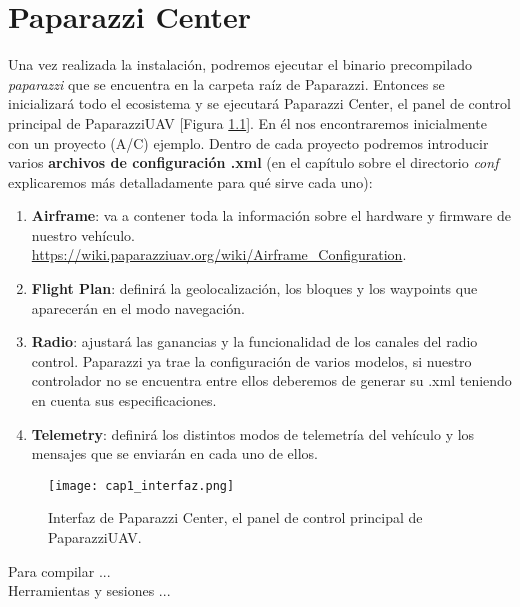 \chapter{Paparazzi Center}


\noindent Una vez realizada la instalación, podremos ejecutar el binario precompilado \textit{paparazzi} que se encuentra en la carpeta raíz de Paparazzi. Entonces se inicializará todo el ecosistema y se ejecutará Paparazzi Center, el panel de control principal de PaparazziUAV [Figura \ref{fig:cap1_interfaz}]. En él nos encontraremos inicialmente con un proyecto (A/C) ejemplo. Dentro de cada proyecto podremos introducir varios \textbf{archivos de configuración .xml} (en el capítulo sobre el directorio \textit{conf} explicaremos más detalladamente para qué sirve cada uno):

\begin{enumerate}
    \item \textbf{Airframe}: va a contener toda la información sobre el hardware y firmware de nuestro vehículo. \url{https://wiki.paparazziuav.org/wiki/Airframe_Configuration}.
    
    \item \textbf{Flight Plan}: definirá la geolocalización, los bloques y los waypoints que aparecerán en el modo navegación.
    
    \item \textbf{Radio}: ajustará las ganancias y la funcionalidad de los canales del radio control. Paparazzi ya trae la configuración de varios modelos, si nuestro controlador no se encuentra entre ellos deberemos de generar su .xml teniendo en cuenta sus especificaciones.
    
    \item \textbf{Telemetry}: definirá los distintos modos de telemetría del vehículo y los mensajes que se enviarán en cada uno de ellos. 
    
\end{enumerate}

\begin{figure}[h!]
    \centering
    \texttt{[image: cap1\_interfaz.png]}
    \caption{Interfaz de Paparazzi Center, el panel de control principal de PaparazziUAV.} \label{fig:cap1_interfaz}
\end{figure}

\newpage

Para compilar ... \\

Herramientas y sesiones ... \\

